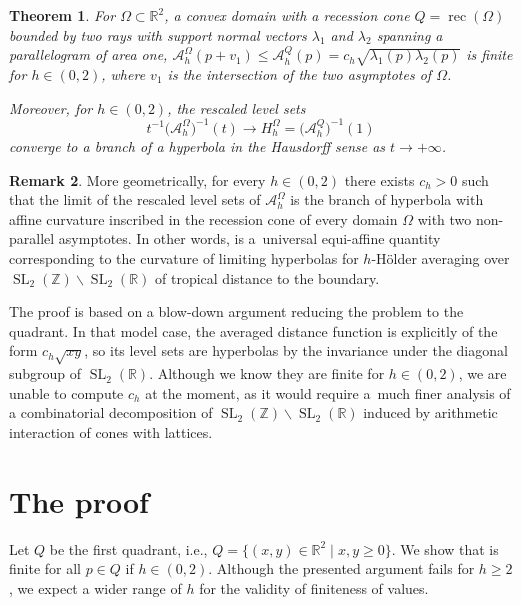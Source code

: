 \documentclass[pdftex]{sigma}
\numberwithin{equation}{section}
\newtheorem{Theorem}{Theorem}[section]
\theoremstyle{definition}
\newtheorem{Remark}[Theorem]{Remark}
\begin{document}
\begin{Theorem}
For $\Omega\subset\mathbb{R}^2$, a convex domain with a recession cone $Q=\operatorname{rec}(\Omega)$ bounded by two rays with support normal vectors $\lambda_1$ and $\lambda_2$ spanning a parallelogram of area one, $\mathcal{A}^\Omega_h(p+v_1)\leq \mathcal{A}^Q_h(p)=c_h\sqrt{\lambda_1(p)\lambda_2(p)}$ is finite for $h\in(0,2)$, where $v_1$ is the intersection of the two asymptotes of $\Omega$.

Moreover, for $h\in(0,2)$, the rescaled level sets
\[
t^{-1}\bigl(\mathcal A_h^\Omega\bigr)^{-1}(t)\longrightarrow H^\Omega_h=\bigl(\mathcal{A}^Q_h\bigr)^{-1}(1)
\]
converge to a branch of a hyperbola in the Hausdorff sense as $t\to+\infty$.
\end{Theorem}

\begin{Remark}
More geometrically, for every $h\in(0,2)$ there exists $c_h>0$ such that the limit of the rescaled level sets of $\mathcal{A}^\Omega_h$ is the branch of hyperbola with affine curvature  inscribed in the recession cone of every domain $\Omega$ with two non-parallel asymptotes. In other words,  is a~universal equi-affine quantity corresponding to the curvature of limiting hyperbolas for $h$-H\"older averaging over $\operatorname{SL}_2(\mathbb{Z})\backslash\operatorname{SL}_2(\mathbb{R})$ of tropical distance to the boundary.
\end{Remark}

The proof is based on a blow-down argument reducing the problem to the quadrant. In that model case, the averaged distance function is explicitly of the form $c_h\sqrt{xy}$, so its level sets are hyperbolas by the invariance under the diagonal subgroup of $\operatorname{SL}_2(\mathbb{R})$. Although we know they are finite for $h\in(0,2)$, we are unable to compute $c_h$ at the moment, as it would require a~much finer analysis of a combinatorial decomposition of $\operatorname{SL}_2(\mathbb{Z})\backslash\operatorname{SL}_2(\mathbb{R})$ induced by arithmetic interaction of cones with lattices.

\section{The proof}
Let $Q$ be the first quadrant, i.e., $Q=\bigl\{(x,y)\in\mathbb{R}^2 \mid x,y\geq 0\bigr\}$.
We show that  is finite for all $p\in Q$ if $h\in(0,2)$. Although the presented argument fails for $h\geq 2$, we expect a wider range of $h$ for the validity of finiteness of values.
\end{document}
